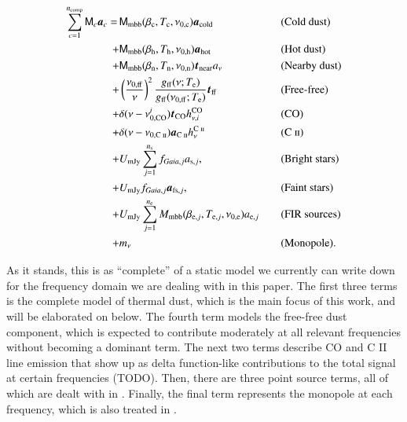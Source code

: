 \documentclass{aa}
\newcommand{\mathsc}[1]{{\normalfont\textsc{#1}}}
\newcommand{\M}[0]{\tens{M}}
\renewcommand{\a}[0]{\vec{a}}
\renewcommand{\t}[0]{\vec{t}}
\newcommand{\cii}{\ensuremath{\mathsc {C\ ii}}}
\def\Tcold{\ifmmode T_\mathrm{c}\else $T_{\mathrm{c}}$\fi}
\def\Thot{\ifmmode T_\mathrm{h}\else $T_{\mathrm{h}}$\fi}
\def\Tnear{\ifmmode T_\mathrm{n}\else $T_{\mathrm{n}}$\fi}
\def\bcold{\ifmmode \beta_\mathrm{c}\else $\beta_{\mathrm{c}}$\fi}
\def\bhot{\ifmmode \beta_\mathrm{h}\else $\beta_{\mathrm{h}}$\fi}
\def\bnear{\ifmmode \beta_\mathrm{n}\else $\beta_{\mathrm{n}}$\fi}
\def\nuzeroff{\ifmmode \nu_{0,\mathrm{ff}}\else $\nu_{0,\mathrm{ff}}$\fi}
\def\nuzerocold{\ifmmode \nu_{0,\mathrm{c}}\else $\nu_{0,\mathrm{c}}$\fi}
\def\nuzerohot{\ifmmode \nu_{0,\mathrm{h}}\else $\nu_{0,\mathrm{h}}$\fi}
\def\nuzeronear{\ifmmode \nu_{0,\mathrm{n}}\else $\nu_{0,\mathrm{n}}$\fi}
\def\Te{\ifmmode T_{\mathrm{e}}\else $T_{\mathrm{e}}$\fi}
\begin{document}
\begin{equation}
\label{eq:skymodel}
\begin{aligned}
  \sum_{c=1}^{n_{\mathrm{comp}}} \M_c \a_c  = \,
  &\M_{\mathrm{mbb}}(\bcold,\Tcold,\nuzerocold)\vec{a}_{\mathrm{cold}}
  && \textrm{(Cold dust)} \\
  + &\M_{\mathrm{mbb}}(\bhot,\Thot,\nuzerohot)
  \vec{a}_{\mathrm{hot}} && \textrm{(Hot dust)}\\
  + &\M_{\mathrm{mbb}}(\bnear,\Tnear,\nuzeronear) \t_{\mathrm{near}}
  a_{\nu} && \textrm{(Nearby dust)} \\
  + &\left(\frac{\nuzeroff}{\nu}\right)^2
  \frac{g_{\mathrm{ff}}(\nu;\Te) }{g_{\mathrm{ff}}(\nuzeroff;\Te)}
  \vec{t}_{\mathrm{ff}} && \textrm{(Free-free)} \\
  + &\delta(\nu-\nu_{0,\mathrm{CO}}^i) \t_{\mathrm{CO}}
  h^{\mathrm{CO}}_{\nu,i} && \textrm{(CO)}\\
  + &\delta(\nu-\nu_{0,\cii}) \a_{\cii}
	h^{\cii}_{\nu} && (\cii)\\
  + &U_{\mathrm{mJy}} \sum_{j=1}^{n_{\mathrm{s}}}
  f_{\mathit{Gaia},j} a_{\mathrm{s},j}, &\quad&
  \textrm{(Bright stars)} \\
  + &U_{\mathrm{mJy}} f_{\mathit{Gaia},j} \a_{\mathrm{fs},j}, &\quad&
  \textrm{(Faint stars)} \\  
    + &U_{\mathrm{mJy}} \sum_{j=1}^{n_{\mathrm{e}}}
  M_{\mathrm{mbb}}(\beta_{\mathrm{e},j},
  T_{\mathrm{e},j}, \nu_{0,\mathrm{e}})
  a_{\mathrm{e},j} && \textrm{(FIR sources)}\\
  + &m_{\nu} && \textrm{(Monopole)}. 
\end{aligned}
\end{equation}

As it stands, this is as ``complete'' of a static model we currently can write down
for the frequency domain we are dealing with in this paper. The first three
terms is the complete model of thermal dust, which is the main focus of this
work, and will be elaborated on below. The fourth term models the free-free
dust component, which is expected to contribute moderately at all relevant
frequencies without becoming a dominant term. The next two terms describe CO
and C II line emission that show up as delta function-like contributions to the
total signal at certain frequencies (TODO). Then, there are three point source
terms, all of which are dealt with in \citet{CG02_04}. Finally, the final term
represents the monopole at each frequency, which is also treated in
\citet{CG02_03}.
\end{document}
